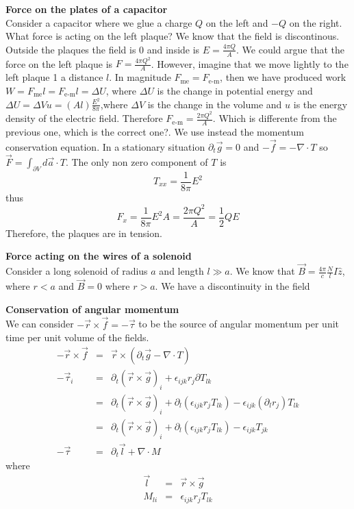 \documentclass[12pt,a4paper]{article}
\begin{document}
\textbf{Force on the plates of a capacitor}\\
Consider a capacitor where we glue a charge $Q$ on the left and $-Q$ on the right. What force is acting on the left plaque? We know that the field is discontinous. Outside the plaques the field is 0 and inside is $E = \frac{4\pi Q}{A}$. We could argue that the force on the left plaque is $F  = \frac{4\pi Q^2}{A}$. However, imagine that we move lightly to the left plaque 1 a distance $l$. In magnitude $F_{\text{me}} = F_{\text{e-m}}$, then we have produced work $W = F_{\text{me}} l = F_{\text{e-m}} l= \Delta U$, where $\Delta U$ is the change in potential energy and $\Delta U = \Delta V u = (A l)\frac{E^2}{8\pi}$,where $\Delta V$ is the change in the volume and $u$ is the energy density of the electric field. Therefore $F_{\text{e-m}} = \frac{2\pi Q^2}{A}$. Which is differente from the previous one, which is the correct one?. We use instead the momentum conservation equation. In a stationary situation $\partial_t\vec{g} = 0$ and
$-\vec{f} = -\nabla \cdot T$ so $\vec{F} = \int_{\partial V} d\vec{a}\cdot T$. The only non zero component of $T$ is 
\begin{equation}
	T_{xx} = \frac{1}{8\pi}E^2 
\end{equation}
thus
\begin{equation}
	F_x = \frac{1}{8\pi}E^2 A = \frac{2\pi Q^2}{A} = \frac{1}{2}Q E
\end{equation}
Therefore, the plaques are in tension.

\textbf{Force acting on the wires of a solenoid}\\
Consider a long solenoid of radius $a$ and length $l \gg a$.  We know that $\vec{B} = \frac{4\pi}{c}\frac{N}{l} I \hat{z}$, where $r<a$ and $\vec{B} = 0$ where $r>a$. We have a discontinuity in the field 

\textbf{Conservation of angular momentum}\\
We can consider $-\vec{r}\times \vec{f}=-\vec{\tau}$ to be the source of angular momentum per unit time per unit volume of the fields.
\begin{eqnarray}
	-\vec{r}\times \vec{f} & = & \vec{r}\times(\partial_t \vec{g} - \nabla\cdot T) \\
	-\vec{\tau}_i & = & \partial_t(\vec{r}\times\vec{g})_i  + \epsilon_{ijk}r_j\partial T_{lk} \\
	& = & \partial_t(\vec{r}\times\vec{g})_i + \partial_l (\epsilon_{ijk}r_jT_{lk}) - \epsilon_{ijk}(\partial_l r_j)T_{lk} \\
	& = & \partial_t(\vec{r}\times\vec{g})_i + \partial_l (\epsilon_{ijk}r_jT_{lk}) - \epsilon_{ijk}T_{jk}\\
	-\vec{\tau} & = & \partial_t \vec{l} + \nabla\cdot M
\end{eqnarray}
where 
\begin{eqnarray}
	\vec{l} & = & \vec{r}\times \vec{g}\\
	M_{li} & = & \epsilon_{ijk}r_j T_{lk}
\end{eqnarray}
\end{document}
